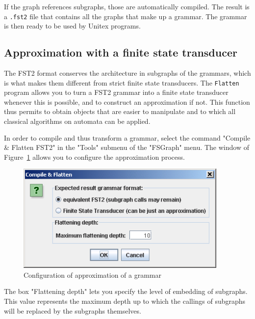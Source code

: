 \noindent If the graph references subgraphs, those are automatically compiled.
The result is a \verb+.fst2+ file that contains all the graphs
that make up a grammar. The grammar is then ready to be used by Unitex programs.

\subsection{Approximation with a finite state transducer}
The FST2 format conserves the architecture in subgraphs of the grammars, which
is what makes them different from strict finite state transducers. The 
\verb+Flatten+ program allows you to turn a FST2 grammar into a finite
state transducer whenever this is possible, and to construct an approximation if not.
This function thus permits to obtain objects that are easier to manipulate and
to which all classical algorithms on automata can be applied.

\bigskip
\noindent In order to compile and thus transform a grammar, select the command
"Compile \& Flatten FST2" in the "Tools" submenu of the "FSGraph" menu. The
window of Figure~\ref{fig-flatten-configuration} allows you to
configure the approximation process.

\bigskip
\begin{figure}[!h]
\begin{center}
\includegraphics[width=10.4cm]{resources/img/fig6-5.png}
\caption{Configuration of approximation of a
grammar\label{fig-flatten-configuration}}
\end{center}
\end{figure}

\noindent The box "Flattening depth" lets you specify the level of embedding of
subgraphs. This value represents the maximum depth up to which the callings of
subgraphs will be replaced by the subgraphs themselves.


